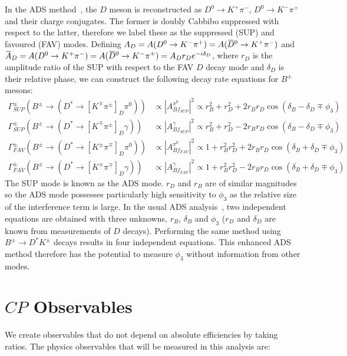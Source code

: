 \documentclass[oneside,12pt]{article}
\newcommand{\overbar}[1]{\mkern 1.5mu\overline{\mkern-1.5mu#1\mkern-1.5mu}\mkern
1.5mu}
\begin{document}
In the ADS method~\cite{ADSRef}, the $D$ meson is reconstructed as
$D^{0}\rightarrow K^{+}\pi^{-}$, $D^{0}\rightarrow K^{-}\pi^{+}$ and their
charge conjugates. The former is doubly Cabbibo suppressed with respect to the
latter, therefore we label these as the suppressed (SUP) and favoured (FAV)
modes. Defining $A_{D}=A(D^{0}\rightarrow
K^{-}\pi^{+})=A(\overbar{D}^{0}\rightarrow K^{+}\pi^{-})$ and $\overbar{A}_{D}=
A(D^{0}\rightarrow K^{+}\pi^{-})=A(\overbar{D}^{0}\rightarrow
K^{-}\pi^{+})=A_{D}r_{D}e^{-i\delta_{D}}$, where $r_{D}$ is the amplitude ratio
of the SUP with respect to the FAV $D$ decay mode and $\delta_{D}$ is their
relative phase, we can construct the following decay rate equations for
$B^{\pm}$ mesons:
  \begin{align*}
		\Gamma_{SUP}^{\pm}(B^{\pm}\rightarrow (D^{*}\rightarrow
[K^{\mp}\pi^{\pm}]_D\pi^{0})) &\propto |A^{\pi^0}_{Bf_{SUP}}|^2 \propto r_{B}^{2}
+ r_{D}^{2} + 2r_{B}r_{D}\cos(\delta_{B} - \delta_{D} \mp \phi_{3}) \\
		\Gamma_{SUP}^{\pm}(B^{\pm}\rightarrow (D^{*}\rightarrow
[K^{\mp}\pi^{\pm}]_D\gamma)) &\propto |A^{\gamma}_{Bf_{SUP}}|^2 \propto r_{B}^{2}
+ r_{D}^{2} - 2r_{B}r_{D}\cos(\delta_{B} - \delta_{D} \mp \phi_{3}) \\
		\Gamma_{FAV}^{\pm}(B^{\pm}\rightarrow (D^{*}\rightarrow
[K^{\pm}\pi^{\mp}]_D\pi^{0})) &\propto |A^{\pi^0}_{Bf_{FAV}}|^2 \propto 1 +
r_{B}^{2}r_{D}^{2} + 2r_{B}r_{D}\cos(\delta_{B} + \delta_{D} \mp \phi_{3}) \\
		\Gamma_{FAV}^{\pm}(B^{\pm}\rightarrow (D^{*}\rightarrow
[K^{\pm}\pi^{\mp}]_D\gamma)) &\propto |A^{\gamma}_{Bf_{FAV}}|^2 \propto 1 +
r_{B}^{2}r_{D}^{2} - 2r_{B}r_{D}\cos(\delta_{B} + \delta_{D} \mp \phi_{3})
  \end{align*}
\noindent The SUP mode is known as the ADS mode. $r_{D}$ and $r_{B}$ are of
similar magnitudes so the ADS mode possesses particularly high sensitivity to
$\phi_3$ as the relative size of the interference term is large. In the usual
ADS analysis~\cite{ADSRef}, two independent equations are obtained with three
unknowns, $r_B$, $\delta_B$ and $\phi_3$ ($r_{D}$ and $\delta_D$ are known from
measurements of $D$ decays). Performing the same method using
$B^{\pm}\rightarrow D^{*}K^{\pm}$ decays results in four independent equations. This
enhanced ADS method therefore has the potential to measure $\phi_3$ without
information from other modes.

\section{\normalsize $CP$ Observables} \label{sec:observables}
We create observables that do not depend on absolute efficiencies by taking
ratios. The physics observables that will be measured in this analysis are:
\end{document}

